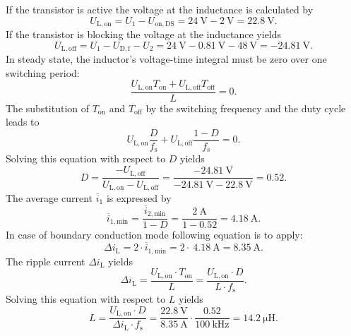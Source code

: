 \begin{solutionblock}
    If the transistor is active the voltage at the inductance is calculated by
    \begin{equation*}
        U_\mathrm{L,on}=U_\mathrm{1}- U_{\mathrm{on},\mathrm{DS}} = \SI{24}{\volt} - \SI{2}{\volt} = \SI{22.8}{\volt}.
        \label{eq:voltage_ratio}
    \end{equation*}
    If the transistor is blocking the voltage at the inductance yields
    \begin{equation*}
        U_\mathrm{L,off}= U_\mathrm{1} - U_{\mathrm{D},\mathrm{f}} - U_\mathrm{2} = \SI{24}{\volt} - \SI{0.81}{\volt} - \SI{48}{\volt} = -\SI{24.81}{\volt}.
        \label{eq:voltage_ratio}
    \end{equation*}
    In steady state, the inductor's voltage-time integral must be zero over one switching period: 
    \begin{equation*}
        \frac{U_\mathrm{L,on} T_\mathrm{on} + U_\mathrm{L,off} T_\mathrm{off}}{L} = 0.
        \label{eq:voltage_ratio}
    \end{equation*}
    The substitution of $T_\mathrm{on}$ and $T_\mathrm{off}$ by the switching frequency and the duty cycle leads to
    \begin{equation*}
        U_\mathrm{L,on} \frac{D} {f_\mathrm{s}} + U_\mathrm{L,off} \frac{1-D} {f_\mathrm{s}} = 0.
        \label{eq:voltage_ratio}
    \end{equation*}
    Solving this equation with respect to $D$ yields
    \begin{equation*}
        D=\frac{-U_\mathrm{L,off}}{U_\mathrm{L,on}-U_\mathrm{L,off}}=\frac{-\SI{24.81}{\volt}}{-\SI{24.81}{\volt}-\SI{22.8}{\volt}}=0.52.
        \label{eq:dutycycle}
    \end{equation*}
    The average current $\overline{i}_\mathrm{1}$ is expressed by
   \begin{equation*}
       \overline{i}_\mathrm{1,min} = \frac {\overline{i}_\mathrm{2,min}}{1-D}= \frac {\SI{2}{\ampere}}{1-0.52}=\SI{4.18}{\ampere}.
   \end{equation*}
   In case of boundary conduction mode following equation is to apply:
   \begin{equation*}
       \Delta i_\mathrm{L}= 2 \cdot \overline{i}_\mathrm{1,min} = 2 \cdot\ \SI{4.18}{\ampere} = \SI{8.35}{\ampere}.
   \end{equation*}
   The ripple current $\Delta i_\mathrm{L}$ yields
   \begin{equation*}
       \Delta i_\mathrm{L}=\frac{U_\mathrm{L,on} \cdot T_\mathrm{on}}{L} =\frac{U_\mathrm{L,on} \cdot D}{L \cdot f_\mathrm{s}}.
   \end{equation*}
   Solving this equation with respect to $L$ yields
   \begin{equation*}
       L= \frac{U_\mathrm{L,on} \cdot D}{\Delta i_\mathrm{L} \cdot f_\mathrm{s}} = \frac{\SI{22.8}{\volt}}{\SI{8.35}{\ampere}} \cdot \frac{0.52}{\SI{100}{\kilo\hertz}} = \SI{14.2}{\micro\henry}.
   \end{equation*}
\end{solutionblock}


